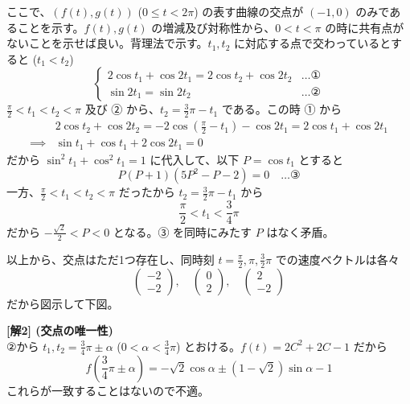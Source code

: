 \documentclass[../main.tex]{subfiles}
\begin{document}
ここで、$(f(t), g(t))$ ($0 \le t < 2\pi$) の表す曲線の交点が $(-1,0)$ のみであることを示す。$f(t), g(t)$ の増減及び対称性から、$0 < t < \pi$ の時に共有点がないことを示せば良い。背理法で示す。$t_1, t_2$ に対応する点で交わっているとすると ($t_1 < t_2$)
\[
  \begin{cases}
    2\cos t_1 + \cos 2t_1 = 2\cos t_2 + \cos 2t_2 & \dots \text{①} \\
    \sin 2t_1 = \sin 2t_2 & \dots \text{②}
  \end{cases}
\]
$\frac{\pi}{2} < t_1 < t_2 < \pi$ 及び ② から、$t_2 = \frac{3}{2}\pi - t_1$ である。この時 ① から
\begin{align*}
  & 2\cos t_2 + \cos 2t_2 = -2\cos \left(\frac{\pi}{2} - t_1\right) - \cos 2t_1 = 2\cos t_1 + \cos 2t_1 \\
  \implies & \sin t_1 + \cos t_1 + 2\cos 2t_1 = 0
\end{align*}
だから $\sin^2 t_1 + \cos^2 t_1 = 1$ に代入して、以下 $P = \cos t_1$ とすると
\[
  P(P+1)(5P^2 - P - 2) = 0 \quad \dots \text{③}
\]
一方、$\frac{\pi}{2} < t_1 < t_2 < \pi$ だったから $t_2 = \frac{3}{2}\pi - t_1$ から
\[
  \frac{\pi}{2} < t_1 < \frac{3}{4}\pi
\]
だから $-\frac{\sqrt{2}}{2} < P < 0$ となる。③ を同時にみたす $P$ はなく矛盾。

\bigskip
\noindent
以上から、交点はただ1つ存在し、同時刻 $t = \frac{\pi}{2}, \pi, \frac{3}{2}\pi$ での速度ベクトルは各々
\[
  \begin{pmatrix} -2 \\ -2
  \end{pmatrix}, \quad
  \begin{pmatrix} 0 \\ 2
  \end{pmatrix}, \quad
  \begin{pmatrix} 2 \\ -2
  \end{pmatrix}
\]
だから図示して下図。

\begin{center}
\end{center}

\bigskip
\noindent
\textbf{[解2] (交点の唯一性)}\\
②から $t_1, t_2 = \frac{3}{4}\pi \pm \alpha$ ($0 < \alpha < \frac{3}{4}\pi$) とおける。$f(t) = 2C^2 + 2C - 1$ だから
\[
  f\left(\frac{3}{4}\pi \pm \alpha\right) = -\sqrt{2}\cos\alpha \pm (1-\sqrt{2})\sin\alpha - 1
\]
これらが一致することはないので不適。 \quad \text{\#\#}
\end{document}
